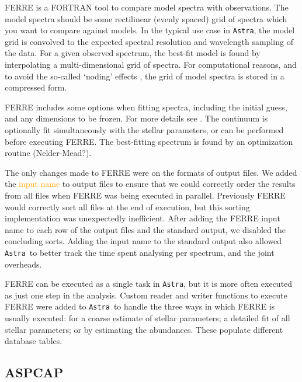 \documentclass[modern]{aastex631}
\newcommand{\astra}{\texttt{Astra}}
\newcommand{\todo}[1]{\textcolor{orange}{#1}}
\begin{document}
FERRE \citep[or FERRE]{ferre} %
is a FORTRAN tool to compare model spectra with observations.
The model spectra should be some rectilinear (evenly spaced) grid of spectra which you want to compare against models.
In the typical use case in \astra, the model grid is convolved to the expected spectral resolution and wavelength sampling of the data.
For a given observed spectrum, the best-fit model is found by interpolating a multi-dimensional grid of spectra.
For computational reasons, and to avoid the so-called `noding' effects \citep{CITE}, the grid of model spectra is stored in a compressed form.

FERRE includes some options when fitting spectra, including the initial guess, and any dimensions to be frozen. For more details see \citet{CITE}.
The continuum is optionally fit simultaneously with the stellar parameters, or can be performed before executing FERRE.
The best-fitting spectrum is found by an optimization routine (Nelder-Mead?).

The only changes made to FERRE were on the formats of output files. We added the \todo{input name} to output files to ensure that we could correctly order the results from all files when FERRE was being executed in parallel. 
Previously FERRE would correctly sort all files at the end of execution, but this sorting implementation was unexpectedly inefficient. 
After adding the FERRE input name to each row of the output files and the standard output, we disabled the concluding sorts.
Adding the input name to the standard output also allowed \astra\ to better track the time spent analysing per spectrum, and the joint overheads.

FERRE can be executed as a single task in \astra, but it is more often executed as just one step in the analysis.
Custom reader and writer functions to execute FERRE were added to \astra\ to handle the three ways in which FERRE is usually executed: for a coarse estimate of stellar parameters; a detailed fit of all stellar parameters; or by estimating the abundances. These populate different database tables. 

\subsection{ASPCAP} \label{sec:methods-aspcap}
\end{document}

